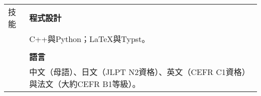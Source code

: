 \documentclass[letterpaper, 11pt]{article}
\begin{document}
\begin{CJK*}{UTF8}{bsmi}
\begin{center}
\begin{longtable}{p{0.72in}p{5.97in}}
        
        {\textcolor{OliveGreen}{技能}} 
        & \textbf{程式設計}\\
        & C++與Python；\LaTeX 與Typst。 \\
        & \\
        
        & \textbf{語言} \\
        & 中文（母語）、日文（JLPT N2資格）、英文（CEFR C1資格）與法文（大約CEFR B1等級）。 \\
        
        
    \end{longtable}
\end{center}

\end{CJK*}
\end{document}
